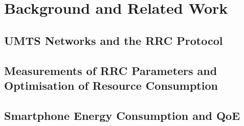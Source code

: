\section{Background and Related Work}\label{sec:network:background}

\subsection{\acrshort{UMTS} Networks and the \acrshort{RRC} Protocol}\label{sec:network:background:umts_rrc}

\subsection{Measurements of \acrshort{RRC} Parameters and Optimisation of Resource Consumption}\label{sec:network:background:measurement_optimisation}

\subsection{Smartphone Energy Consumption and \acrshort{QoE}}\label{sec:network:background:energy_consumption_qoe}
